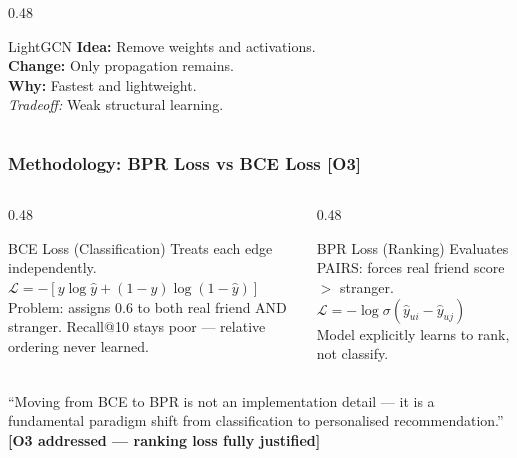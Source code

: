 \documentclass[10pt,aspectratio=43]{beamer}
\begin{document}
\begin{frame}
\begin{columns}[T]
\begin{column}{0.48\textwidth}
\vspace{0.2em}

\begin{alertblock}{LightGCN}
\small
\textbf{Idea:} Remove weights and activations.\\
\textbf{Change:} Only propagation remains.\\
\textbf{Why:} \alert{Fastest and lightweight}.\\
\textit{Tradeoff:} Weak structural learning.
\end{alertblock}

\end{column}

\end{columns}

\end{frame}

\begin{frame}
\frametitle{Methodology: BPR Loss vs BCE Loss \textbf{[O3]}}
\begin{columns}[T]
\begin{column}{0.48\textwidth}
\begin{alertblock}{BCE Loss (Classification)}
Treats each edge independently.\\
$\mathcal{L} = -[y\log\hat{y} + (1{-}y)\log(1{-}\hat{y})]$\\[4pt]
Problem: assigns 0.6 to both real friend AND stranger.
Recall@10 stays poor --- relative ordering never learned.
\end{alertblock}
\end{column}
\begin{column}{0.48\textwidth}
\begin{exampleblock}{BPR Loss (Ranking)}
Evaluates PAIRS: forces real friend score $>$ stranger.\\
$\mathcal{L} = -\log\sigma(\hat{y}_{ui} - \hat{y}_{uj})$\\[4pt]
Model explicitly learns to rank, not classify.
\end{exampleblock}
\end{column}
\end{columns}
\vspace{0.5em}
\alert{``Moving from BCE to BPR is not an implementation detail --- it is a fundamental paradigm shift from classification to personalised recommendation.''}\\[4pt]
\textbf{[O3 addressed --- ranking loss fully justified]}
\end{frame}
\end{document}
